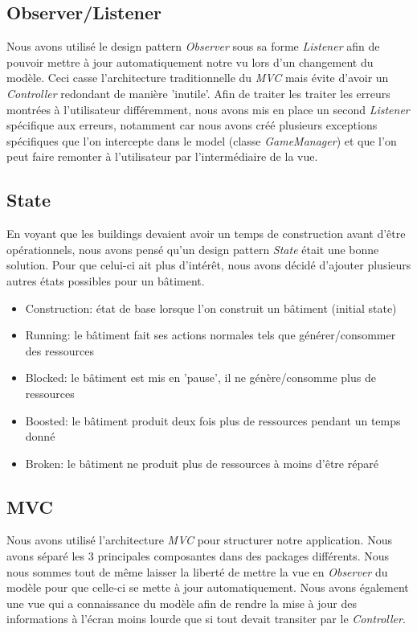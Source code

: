 \documentclass{article}
\begin{document}
\subsection{Observer/Listener}
Nous avons utilisé le design pattern \textit{Observer} sous sa forme \textit{Listener} afin de pouvoir mettre à jour automatiquement
notre vu lors d'un changement du modèle. Ceci casse l'architecture traditionnelle du \textit{MVC} mais évite d'avoir un \textit{Controller}
redondant de manière 'inutile'. Afin de traiter les traiter les erreurs montrées à l'utilisateur différemment, nous avons mis en place
un second \textit{Listener} spécifique aux erreurs, notamment car nous avons créé plusieurs exceptions spécifiques que l'on intercepte
dans le model (classe \textit{GameManager}) et que l'on peut faire remonter à l'utilisateur par l'intermédiaire de la vue.

\subsection{State}
En voyant que les buildings devaient avoir un temps de construction avant d'être opérationnels, nous avons pensé qu'un design pattern
\textit{State} était une bonne solution. Pour que celui-ci ait plus d'intérêt, nous avons décidé d'ajouter plusieurs autres états possibles
pour un bâtiment.
\begin{itemize}
    \item Construction: état de base lorsque l'on construit un bâtiment (initial state)
    \item Running: le bâtiment fait ses actions normales tels que générer/consommer des ressources
    \item Blocked: le bâtiment est mis en 'pause', il ne génère/consomme plus de ressources
    \item Boosted: le bâtiment produit deux fois plus de ressources pendant un temps donné
    \item Broken: le bâtiment ne produit plus de ressources à moins d'être réparé
\end{itemize}

\subsection{MVC}
Nous avons utilisé l'architecture \textit{MVC} pour structurer notre application. Nous avons séparé les 3 principales composantes
dans des packages différents. Nous nous sommes tout de même laisser la liberté de mettre la vue en \textit{Observer} du modèle pour
que celle-ci se mette à jour automatiquement. Nous avons également une vue qui a connaissance du modèle afin de rendre la mise à
jour des informations à l'écran moins lourde que si tout devait transiter par le \textit{Controller}.
\end{document}
